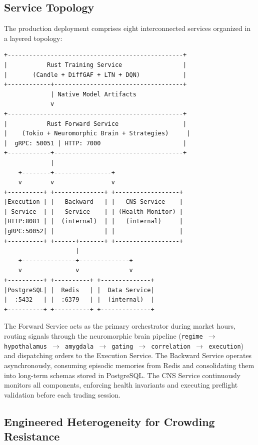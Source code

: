 \documentclass[12pt, a4paper]{article}
\begin{document}
\subsection{Service Topology}
\label{sec:topology}

The production deployment comprises eight interconnected services organized in a layered topology:

\begin{tcolorbox}[colback=codegray, colframe=rustcolor, title=System Architecture (Pure Rust)]
	\begin{verbatim}
+-------------------------------------------------+
|           Rust Training Service                 |
|       (Candle + DiffGAF + LTN + DQN)            |
+------------+------------------------------------+
             | Native Model Artifacts
             v
+-------------------------------------------------+
|           Rust Forward Service                  |
|    (Tokio + Neuromorphic Brain + Strategies)     |
|  gRPC: 50051 | HTTP: 7000                       |
+------------+------------------------------------+
             |
    +--------+----------------+
    v        v                v
+----------+ +--------------+ +------------------+
|Execution | |   Backward   | |   CNS Service    |
| Service  | |   Service    | | (Health Monitor) |
|HTTP:8081 | |  (internal)  | |   (internal)     |
|gRPC:50052| |              | |                  |
+----------+ +------+-------+ +------------------+
                    |
    +---------------+--------------+
    v               v              v
+----------+ +----------+ +--------------+
|PostgreSQL| |  Redis   | |  Data Service|
|  :5432   | |  :6379   | |  (internal)  |
+----------+ +----------+ +--------------+
	\end{verbatim}
\end{tcolorbox}

The Forward Service acts as the primary orchestrator during market hours, routing signals through the neuromorphic brain pipeline (\texttt{regime $\to$ hypothalamus $\to$ amygdala $\to$ gating $\to$ correlation $\to$ execution}) and dispatching orders to the Execution Service. The Backward Service operates asynchronously, consuming episodic memories from Redis and consolidating them into long-term schemas stored in PostgreSQL. The CNS Service continuously monitors all components, enforcing health invariants and executing preflight validation before each trading session.

\subsection{Engineered Heterogeneity for Crowding Resistance}
\label{sec:heterogeneity}
\end{document}
